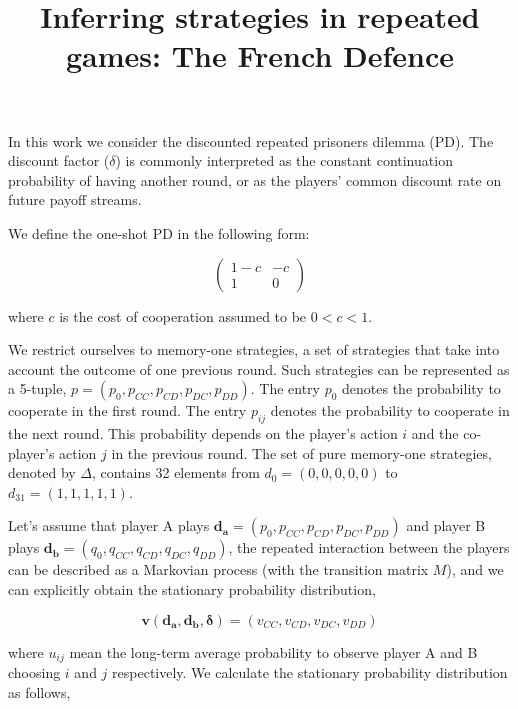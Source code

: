 \documentclass[11pt]{article}
\title{\bf  \sffamily \Large Inferring strategies in repeated games: The French Defence\\}
\date{}
\begin{document}
\maketitle

In this work we consider the discounted repeated prisoners dilemma (PD). The
discount factor (\(\delta\)) is commonly interpreted as the constant continuation
probability of having another round, or as the players' common discount rate on
future payoff streams.

We define the one-shot PD in the following form:

\begin{equation}
    \begin{pmatrix}
            1 - c & -c \\
            1 & 0
    \end{pmatrix}
\end{equation}

where \(c\) is the cost of cooperation assumed to be \(0 < c < 1\).

We restrict ourselves to memory-one strategies, a set of strategies that take
into account the outcome of one previous round. Such strategies can be
represented as a 5-tuple, \(p=(p_{0}, p_{CC}, p_{CD}, p_{DC}, p_{DD})\). The
entry \(p_0\) denotes the probability to cooperate in the first round. The entry
\(p_{ij}\) denotes the probability to cooperate in the next round. This
probability depends on the player's action \(i\) and the co-player's action
\(j\) in the previous round. The set of pure memory-one strategies, denoted
by \(\Delta\), contains 32 elements from \(d_{0} = (0, 0, 0, 0, 0)\) to
\(d_{31} = (1, 1, 1, 1, 1)\).

Let's assume that player A plays \(\mathbf{d_{a}} = (p_{0}, p_{CC}, p_{CD},
p_{DC}, p_{DD})\) and player B plays \(\mathbf{d_{b}} = (q_{0}, q_{CC}, q_{CD},
q_{DC}, q_{DD})\), the repeated interaction between the players can be described
as a Markovian process (with the transition matrix \(M\)), and we can explicitly
obtain the stationary probability distribution,

\begin{equation*}
    \mathbf{v(\mathbf{d_{a}}, \mathbf{d_{b}}, \delta)} = (v_{CC}, v_{CD}, v_{DC}, v_{DD})
\end{equation*}

where \(u_{ij}\) mean the long-term average probability to observe player A
and B choosing \(i\) and \(j\) respectively. We calculate the stationary probability
distribution as follows,
\end{document}

